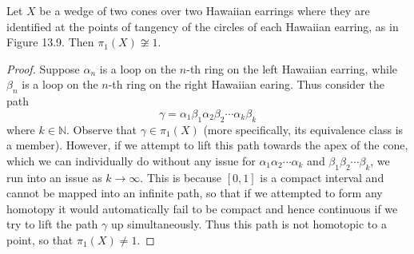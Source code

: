\documentclass[a4paper,12pt,twoside]{hmcpset}
\begin{document}
\begin{problem}[Theorem 13.44]
    Let $X$ be a wedge of two cones over two Hawaiian earrings where
    they are identified at the points of tangency of the circles of
    each Hawaiian earring, as in Figure 13.9. Then $\pi_1(X) \not\cong
    1$.
\end{problem}

\begin{proof}
    Suppose $\alpha_n$ is a loop on the $n$-th ring on the left
    Hawaiian earring, while $\beta_n$ is a loop on the $n$-th ring on
    the right Hawaiian earing. Thus consider the path 
    \[
        \gamma = \alpha_1\beta_1\alpha_2\beta_2\cdots\alpha_k\beta_k
    \]
    where $k \in \mathbb{N}$. Observe that
    $\gamma \in \pi_1(X)$ (more specifically, its equivalence class is a member).
    However, if we attempt to lift this path towards the
    apex of the cone, which we can individually do without any issue
    for $\alpha_1\alpha_2\cdots\alpha_k$ and
    $\beta_1\beta_2\cdots\beta_k$, we run into an issue as $k \to
    \infty$. This is because $[0, 1]$ is a compact interval and cannot
    be mapped into an infinite path, so that if we attempted to form
    any homotopy it would automatically fail to be compact and hence
    continuous if we try to lift the path $\gamma$ up simultaneously.
    Thus this path is not homotopic to a point, so that $\pi_1(X) \ne
    1$. 




\end{proof}
    
\end{document}
